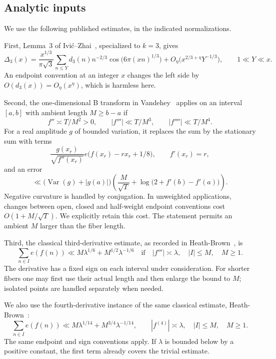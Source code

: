 \documentclass[11pt,a4paper]{article}
\numberwithin{equation}{section}
\theoremstyle{remark}
\DeclareMathOperator{\Var}{Var}
\begin{document}
\subsection{Analytic inputs}
We use the following published estimates, in the indicated normalizations.

First, Lemma~3 of Ivi\'c--Zhai~\cite{IZ}, specialized to $k=3$, gives
\begin{equation}\label{eq:voronoi}
 \Delta_3(x)=\frac{x^{1/3}}{\pi\sqrt3}
 \sum_{n\le Y}d_3(n)n^{-2/3}
       \cos\bigl(6\pi(xn)^{1/3}\bigr)
 +O_\eta\bigl(x^{2/3+\eta}Y^{-1/3}\bigr),
 \qquad 1\ll Y\ll x.
\end{equation}
An endpoint convention at an integer $x$ changes the left side by
$O(d_3(x))=O_\eta(x^\eta)$, which is harmless here.

Second, the one-dimensional B transform in Vandehey~\cite[Theorem~1.1]{Vand}
applies on an interval $[a,b]$ with ambient length $M\ge b-a$ if
\[
 f''\asymp T/M^2>0,\qquad
 |f'''|\ll T/M^3,\qquad |f''''|\ll T/M^4.
\]
For a real amplitude $g$ of bounded variation, it replaces the sum by the
stationary sum with terms
\[
 \frac{g(x_r)}{\sqrt{f''(x_r)}}
 e\bigl(f(x_r)-rx_r+1/8\bigr),\qquad f'(x_r)=r,
\]
and an error
\begin{equation}\label{eq:one-B-error}
 \ll \bigl(\Var(g)+|g(a)|\bigr)
 \left(\frac{M}{\sqrt T}
 +\log\bigl(2+f'(b)-f'(a)\bigr)\right).
\end{equation}
Negative curvature is handled by conjugation. In unweighted applications,
changes between open, closed and half-weight endpoint conventions cost
$O(1+M/\sqrt T)$. We explicitly retain this cost. The statement permits an
ambient $M$ larger than the fiber length.

Third, the classical third-derivative estimate, as recorded in
Heath-Brown~\cite[equation~(1), $k=3$]{HB}, is
\begin{equation}\label{eq:third-test}
 \sum_{n\in I}e(f(n))
 \ll M\lambda^{1/6}+M^{1/2}\lambda^{-1/6}
 \quad\text{if}\quad |f'''|\asymp\lambda,
 \quad |I|\le M,\quad M\ge1.
\end{equation}
The derivative has a fixed sign on each interval under consideration. For
shorter fibers one may first use their actual length and then enlarge the
bound to $M$; isolated points are handled separately when needed.

We also use the fourth-derivative instance of the same classical estimate,
Heath-Brown~\cite[equation~(1), $k=4$]{HB}:
\begin{equation}\label{eq:fourth-test}
 \sum_{n\in I}e(f(n))
 \ll M\lambda^{1/14}+M^{3/4}\lambda^{-1/14},
 \qquad |f^{(4)}|\asymp\lambda,\quad |I|\le M,\quad M\ge1.
\end{equation}
The same endpoint and sign conventions apply. If $\lambda$ is bounded below
by a positive constant, the first term already covers the trivial estimate.
\end{document}
